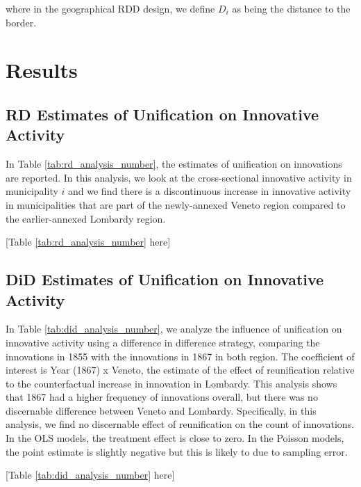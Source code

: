 where in the geographical RDD design, we define $D_i$ as being the distance to the border. 




\section{Results}


\subsection{RD Estimates of Unification on Innovative Activity}

In Table \ref{tab:rd_analysis_number}, the estimates of unification on innovations are reported. In this analysis, we look at the cross-sectional innovative activity in municipality $i$ and we find there is a discontinuous increase in innovative activity in municipalities that are part of the newly-annexed Veneto region compared to the earlier-annexed Lombardy region. 

\begin{center}
    [Table \ref{tab:rd_analysis_number} here]
\end{center}

\subsection{DiD Estimates of Unification on Innovative Activity}

In Table \ref{tab:did_analysis_number}, we analyze the influence of unification on innovative activity using a difference in difference strategy, comparing the innovations in 1855 with the innovations in 1867 in both region. The coefficient of interest is Year (1867) x Veneto, the estimate of the effect of reunification relative to the counterfactual increase in innovation in Lombardy. This analysis shows that 1867 had a higher frequency of innovations overall, but there was no discernable difference between Veneto and Lombardy. Specifically, in this analysis, we find no discernable effect of reunification on the count of innovations. In the OLS models, the treatment effect is close to zero. In the Poisson models, the point estimate is slightly negative but this is likely to due to sampling error. 

\begin{center}
    [Table \ref{tab:did_analysis_number} here]
\end{center}


